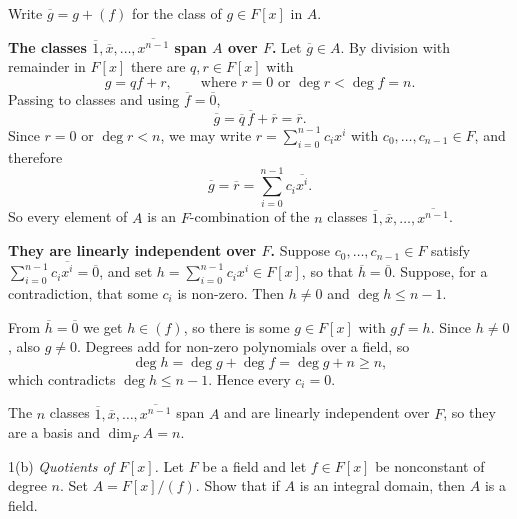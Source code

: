 \documentclass[11pt]{article}
\begin{document}
\begin{solution}
  Write $\overline{g} = g + (f)$ for the class of $g \in F[x]$ in $A$.

  \textbf{The classes $\overline{1}, \overline{x}, \dots, \overline{x^{n-1}}$
  span $A$ over $F$.} Let $\overline{g} \in A$. By division with remainder in
  $F[x]$ there are $q, r \in F[x]$ with
  \[
    g = qf + r, \qquad \text{where } r = 0 \text{ or } \deg r < \deg f = n .
  \]
  Passing to classes and using $\overline{f} = \overline{0}$,
  \[
    \overline{g} = \overline{q}\,\overline{f} + \overline{r} = \overline{r} .
  \]
  Since $r = 0$ or $\deg r < n$, we may write $r = \sum_{i=0}^{n-1} c_i x^i$
  with $c_0, \dots, c_{n-1} \in F$, and therefore
  \[
    \overline{g} = \overline{r} = \sum_{i=0}^{n-1} c_i \overline{x^i} .
  \]
  So every element of $A$ is an $F$-combination of the $n$ classes
  $\overline{1}, \overline{x}, \dots, \overline{x^{n-1}}$.

  \textbf{They are linearly independent over $F$.} Suppose
  $c_0, \dots, c_{n-1} \in F$ satisfy
  $\sum_{i=0}^{n-1} c_i \overline{x^i} = \overline{0}$, and set
  $h = \sum_{i=0}^{n-1} c_i x^i \in F[x]$, so that $\overline{h} = \overline{0}$.
  Suppose, for a contradiction, that some $c_i$ is non-zero. Then $h \neq 0$ and
  $\deg h \leq n-1$.

  From $\overline{h} = \overline{0}$ we get $h \in (f)$, so there is some
  $g \in F[x]$ with $gf = h$. Since $h \neq 0$, also $g \neq 0$. Degrees add for
  non-zero polynomials over a field, so
  \[
    \deg h = \deg g + \deg f = \deg g + n \geq n ,
  \]
  which contradicts $\deg h \leq n-1$. Hence every $c_i = 0$.

  The $n$ classes $\overline{1}, \overline{x}, \dots, \overline{x^{n-1}}$ span
  $A$ and are linearly independent over $F$, so they are a basis and
  $\dim_F A = n$.
\end{solution}

\begin{problem}{1(b)}
  \emph{Quotients of $F[x]$.} Let $F$ be a field and let $f \in F[x]$ be
  nonconstant of degree $n$. Set $A = F[x]/(f)$. Show that if $A$ is an
  integral domain, then $A$ is a field.
\end{problem}
\end{document}
